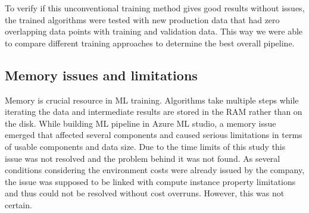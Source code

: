 To verify if this unconventional training method gives good results without issues,
the trained algorithms were tested with new production data
that had zero overlapping data points with training and validation data.
This way we were able to compare different training approaches
to determine the best overall pipeline.












\subsection{Memory issues and limitations}\label{subsec:pipe-memory-issues}
Memory is crucial resource in ML training.
Algorithms take multiple steps while iterating the data
and intermediate results are stored in the RAM rather than on the disk.
While building ML pipeline in Azure ML studio,
a memory issue emerged
that affected several components
and caused serious limitations
in terms of usable components and data size.
Due to the time limits of this study
this issue was not resolved
and the problem behind it was not found.
As several conditions
considering the environment costs
were already issued by the company,
the issue was supposed to be linked with
compute instance property limitations
and thus could not be resolved without cost overruns.
However, this was not certain.




